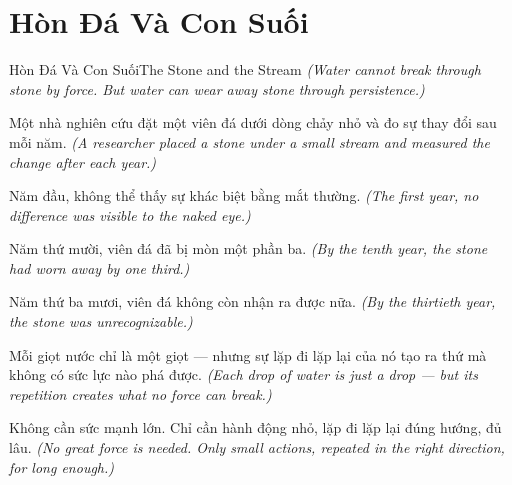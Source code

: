 \section{Hòn Đá Và Con Suối}
\begin{truyen}{Hòn Đá Và Con Suối}{The Stone and the Stream}
\textit{(Water cannot break through stone by force. But water can wear away stone through persistence.)}

Một nhà nghiên cứu đặt một viên đá dưới dòng chảy nhỏ và đo sự thay đổi sau mỗi năm.
\textit{(A researcher placed a stone under a small stream and measured the change after each year.)}

Năm đầu, không thể thấy sự khác biệt bằng mắt thường.
\textit{(The first year, no difference was visible to the naked eye.)}

Năm thứ mười, viên đá đã bị mòn một phần ba.
\textit{(By the tenth year, the stone had worn away by one third.)}

Năm thứ ba mươi, viên đá không còn nhận ra được nữa.
\textit{(By the thirtieth year, the stone was unrecognizable.)}

Mỗi giọt nước chỉ là một giọt — nhưng sự lặp đi lặp lại của nó tạo ra thứ mà không có sức lực nào phá được.
\textit{(Each drop of water is just a drop — but its repetition creates what no force can break.)}

\end{truyen}

\begin{baihoc}
Không cần sức mạnh lớn. Chỉ cần hành động nhỏ, lặp đi lặp lại đúng hướng, đủ lâu.
\textit{(No great force is needed. Only small actions, repeated in the right direction, for long enough.)}
\end{baihoc}
\ngancach

